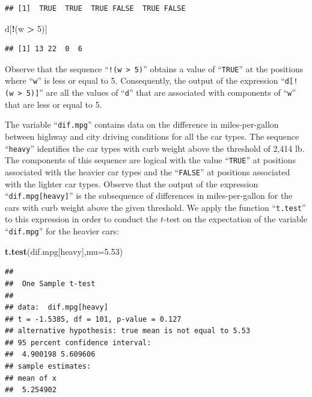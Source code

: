 \documentclass[
]{krantz}
\makeatletter
\newenvironment{Shaded}{\begin{snugshade}}{\end{snugshade}}
\newcommand{\DataTypeTok}[1]{\textcolor[rgb]{0.13,0.29,0.53}{#1}}
\newcommand{\DecValTok}[1]{\textcolor[rgb]{0.00,0.00,0.81}{#1}}
\newcommand{\FloatTok}[1]{\textcolor[rgb]{0.00,0.00,0.81}{#1}}
\newcommand{\KeywordTok}[1]{\textcolor[rgb]{0.13,0.29,0.53}{\textbf{#1}}}
\newcommand{\NormalTok}[1]{#1}
\newcommand{\OperatorTok}[1]{\textcolor[rgb]{0.81,0.36,0.00}{\textbf{#1}}}
\newcommand{\StringTok}[1]{\textcolor[rgb]{0.31,0.60,0.02}{#1}}
\newenvironment{kframe}{%
\medskip{}
\setlength{\fboxsep}{.8em}
 \def\at@end@of@kframe{}%
 \ifinner\ifhmode%
  \def\at@end@of@kframe{\end{minipage}}%
  \begin{minipage}{\columnwidth}%
 \fi\fi%
 \def\FrameCommand##1{\hskip\@totalleftmargin \hskip-\fboxsep
 \colorbox{shadecolor}{##1}\hskip-\fboxsep
     \hskip-\linewidth \hskip-\@totalleftmargin \hskip\columnwidth}%
 \MakeFramed {\advance\hsize-\width
   \@totalleftmargin\z@ \linewidth\hsize
   \@setminipage}}%
 {\par\unskip\endMakeFramed%
 \at@end@of@kframe}
\renewenvironment{Shaded}{\begin{kframe}}{\end{kframe}}
\theoremstyle{definition}
\theoremstyle{definition}
\theoremstyle{definition}
\theoremstyle{remark}
\makeatother
\begin{document}
\begin{verbatim}
## [1]  TRUE  TRUE  TRUE FALSE  TRUE FALSE
\end{verbatim}

\begin{Shaded}
\begin{Highlighting}[]
\NormalTok{d[}\OperatorTok{!}\NormalTok{(w }\OperatorTok{>}\StringTok{ }\DecValTok{5}\NormalTok{)]}
\end{Highlighting}
\end{Shaded}

\begin{verbatim}
## [1] 13 22  0  6
\end{verbatim}

Observe that the sequence ``\texttt{!(w\ \textgreater{}\ 5)}'' obtains a value of ``\texttt{TRUE}'' at
the positions where ``\texttt{w}'' is less or equal to 5. Consequently, the
output of the expression ``\texttt{d{[}!(w\ \textgreater{}\ 5){]}}'' are all the values of ``\texttt{d}''
that are associated with components of ``\texttt{w}'' that are less or equal to
5.

The variable ``\texttt{dif.mpg}'' contains data on the difference in
miles-per-gallon between highway and city driving conditions for all the
car types. The sequence ``\texttt{heavy}'' identifies the car types with curb
weight above the threshold of 2,414 lb. The components of this sequence
are logical with the value ``\texttt{TRUE}'' at positions associated with the
heavier car types and the ``\texttt{FALSE}'' at positions associated with the
lighter car types. Observe that the output of the expression
``\texttt{dif.mpg{[}heavy{]}}'' is the subsequence of differences in miles-per-gallon
for the cars with curb weight above the given threshold. We apply the
function ``\texttt{t.test}'' to this expression in order to conduct the \(t\)-test
on the expectation of the variable ``\texttt{dif.mpg}'' for the heavier cars:

\begin{Shaded}
\begin{Highlighting}[]
\KeywordTok{t.test}\NormalTok{(dif.mpg[heavy],}\DataTypeTok{mu=}\FloatTok{5.53}\NormalTok{)}
\end{Highlighting}
\end{Shaded}

\begin{verbatim}
## 
##  One Sample t-test
## 
## data:  dif.mpg[heavy]
## t = -1.5385, df = 101, p-value = 0.127
## alternative hypothesis: true mean is not equal to 5.53
## 95 percent confidence interval:
##  4.900198 5.609606
## sample estimates:
## mean of x 
##  5.254902
\end{verbatim}
\end{document}
